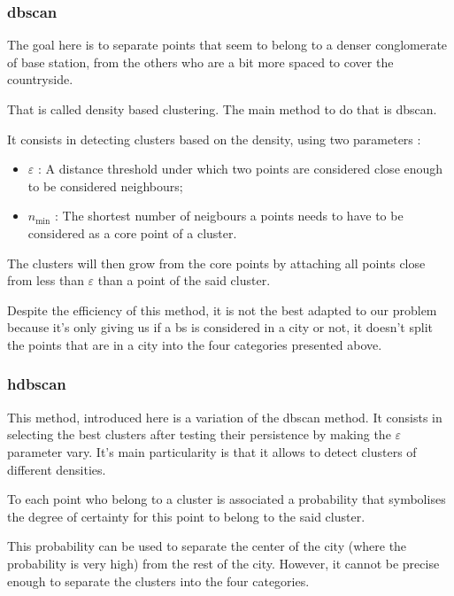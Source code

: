 \documentclass[lettersize,journal,english]{IEEEtran}
\begin{document}
\subsubsection{\acrshort{dbscan}}
The goal here is to separate points that seem to belong to a denser conglomerate of base station, from the others who are a bit more spaced
to cover the countryside.

That is called density based clustering. The main method to do that is \acrshort{dbscan}.

It consists in detecting clusters based on the density, using two parameters :

\begin{itemize}
    \item \emph{$\varepsilon$} : A distance threshold under which two points are considered close enough to be considered neighbours;   
    \item \emph{$n_{\text{min}}$} : The shortest number of neigbours a points needs to have to be considered as a core point of a cluster.
    
\end{itemize}

The clusters will then \og grow\fg{} from the core points by attaching all points close from less than \emph{$\varepsilon$} than a point of the said 
cluster.

Despite the efficiency of this method, it is not the best adapted to our problem because it's only giving us if a \acrshort{bs} is considered 
in a city or not, it doesn't split the points that are in a city into the four categories presented above.

\subsubsection{\acrshort{hdbscan}}
This method, introduced here \cite{10.1007/978-3-642-37456-2_14} is a variation of the \acrshort{dbscan} method. It consists
in selecting the best clusters after testing their persistence by making the $\varepsilon$ parameter vary. It's main particularity
is that it allows to detect clusters of different densities.

To each point who belong to a cluster is associated a probability that symbolises the degree of certainty for this point to belong
to the said cluster.

This probability can be used to separate the center of the city (where the probability is very high) from the rest of the city. However,
it cannot be precise enough to separate the clusters into the four categories.
\end{document}
